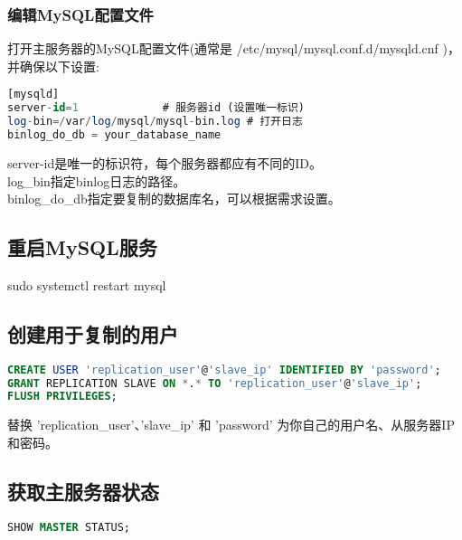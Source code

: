 \documentclass[12pt,twiside,a4paper]{book}
\numberwithin{chapter}{part}
\begin{document}
\subsubsection{编辑MySQL配置文件}
打开主服务器的MySQL配置文件(通常是 /etc/mysql/mysql.conf.d/mysqld.cnf )，并确保以下设置:\\
\begin{lstlisting}[language=sql,breaklines = true]
[mysqld]
server-id=1             # 服务器id (设置唯一标识)
log-bin=/var/log/mysql/mysql-bin.log # 打开日志
binlog_do_db = your_database_name
\end{lstlisting}
server-id是唯一的标识符，每个服务器都应有不同的ID。\\
log\_bin指定binlog日志的路径。\\
binlog\_do\_db指定要复制的数据库名，可以根据需求设置。
\subsection{重启MySQL服务}
sudo systemctl restart mysql
\subsection{创建用于复制的用户}
\begin{lstlisting}[language=sql,breaklines = true]
CREATE USER 'replication_user'@'slave_ip' IDENTIFIED BY 'password';
GRANT REPLICATION SLAVE ON *.* TO 'replication_user'@'slave_ip';
FLUSH PRIVILEGES;
\end{lstlisting}
替换 'replication\_user'、'slave\_ip' 和 'password' 为你自己的用户名、从服务器IP和密码。
\subsection{获取主服务器状态}
\begin{lstlisting}[language=sql,breaklines = true]
SHOW MASTER STATUS;
\end{lstlisting}
\end{document}
